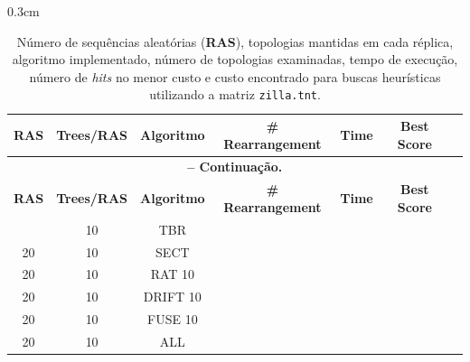 \begin{refsection}
\begin {myindentpar}{0.3cm}
\begin{enumerate}[\itshape i.]
\begin{center}
\begin{longtable}{|c|c|c|c|c|c|c|}
\caption[Tabela \ref{tut5:table:xmu}: Buscas heurísticas com novas tecnologias em TNT]{Número de sequências aleatórias (\textbf{RAS}), topologias mantidas em cada réplica, algoritmo implementado, número de topologias examinadas, tempo de execução, número de \textit{hits} no menor custo e custo encontrado para buscas heurísticas utilizando a matriz \texttt{zilla.tnt}.} \label{tut5:table:xmu} \\


\hline\hline \textbf{RAS} & \textbf{Trees/RAS}  & \textbf{Algoritmo} & \textbf{\# Rearrangement} & \textbf{Time} & \textbf{Best Score}\\
\endfirsthead

\multicolumn{6}{c}{{\bfseries \tablename\ \thetable{} -- Continuação.}}\\
\hline\hline \textbf{RAS} & \textbf{Trees/RAS} & \textbf{Algoritmo} & \textbf{\# Rearrangement} & \textbf{Time} & \textbf{Best Score}\\
\endhead
\hline \hline
\endlastfoot
\hline100 & 10 & TBR &~&~& \\
\hline20 & 10 & SECT &~&~& \\
\hline20 & 10 & RAT 10 &~&~& \\
\hline20 & 10 & DRIFT 10 &~&~& \\
\hline20 & 10 & FUSE 10 &~&~& \\
\hline20 & 10 & ALL &~&~& \\

\end{longtable}
\end{center}


\end{enumerate}
\end{myindentpar}
\end{refsection}
